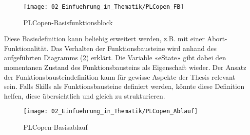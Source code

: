 	\newpage
	
	\begin{figure}[h!]
		\centering
		\texttt{[image: 02\_Einfuehrung\_in\_Thematik/PLCopen\_FB]}
		\captionsetup{justification=centering}
		\caption{PLCopen-Basisfunktionsblock}
		\label{fig:PLCopen_FB}
	\end{figure}
	
	Diese Basisdefinition kann beliebig erweitert werden, z.B. mit einer Abort-Funktionalität. Das Verhalten der Funktionsbausteine wird anhand des aufgeführten Diagramms (\ref{fig:PLCopen_Ablauf}) erklärt. Die Variable «eState» gibt dabei den momentanen Zustand des Funktionsbausteins als Eigenschaft wieder.
	Der Ansatz der Funktionsbausteindefinition kann für gewisse Aspekte der Thesis relevant sein. Falls Skills als Funktionsbausteine definiert werden, könnte diese Definition helfen, diese übersichtlich und gleich zu strukturieren. 
	
	\begin{figure}[h!]
		\centering
		\texttt{[image: 02\_Einfuehrung\_in\_Thematik/PLCopen\_Ablauf]}
		\captionsetup{justification=centering}
		\caption{PLCopen-Basisablauf}
		\label{fig:PLCopen_Ablauf}
	\end{figure}
	
	\newpage
	
	
	